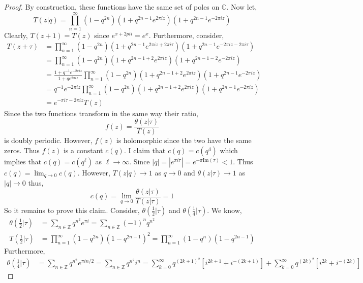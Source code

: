 \documentclass[12pt]{extarticle}
\newcommand{\Z}{\mathbb{Z}}
\newcommand{\C}{\mathbb{C}}
\renewcommand{\Im}[1]{\mathrm{Im}(#1)}
\theoremstyle{definition}
\begin{document}
\begin{proof}
By construction, these functions have the same set of poles on $\C$. Now let,
\[ T(z | q) = \prod_{n = 1}^\infty (1 - q^{2n}) \left(1 + q^{2n - 1} e^{2 \pi i z} \right) \left(1 + q^{2n - 1} e^{-2 \pi i z} \right) \]
Clearly, $T(z + 1) = T(z)$ since $e^{x + 2 pi i} = e^x$. Furthermore, consider,
\begin{align*}
T(z + \tau) & = \prod_{n = 1}^\infty (1 - q^{2n}) \left(1 + q^{2n - 1} e^{2 \pi i z + 2 \pi i \tau} \right) \left(1 + q^{2n - 1} e^{-2 \pi i z - 2 \pi i \tau } \right)
\\
& = \prod_{n = 1}^\infty (1 - q^{2n}) \left(1 + q^{2n - 1 + 2} e^{2 \pi i z } \right) \left(1 + q^{2n - 1 - 2} e^{-2 \pi i z } \right)
\\
& = \frac{1 + q^{-1} e^{-2 \pi i z}}{1 + q e^{2 \pi i z}} \prod_{n = 1}^\infty (1 - q^{2n}) \left(1 + q^{2n - 1 + 2} e^{2 \pi i z } \right) \left(1 + q^{2n - 1} e^{-2 \pi i z } \right)
\\
& = q^{-1} e^{-2 \pi i z} \prod_{n = 1}^\infty (1 - q^{2n}) \left(1 + q^{2n - 1 + 2} e^{2 \pi i z } \right) \left(1 + q^{2n - 1} e^{-2 \pi i z } \right)
\\
& = e^{-\pi i \tau - 2 \pi i z} T(z)
\end{align*}
Since the two functions transform in the same way their ratio,
\[ f(z) = \frac{\theta(z|\tau)}{T(z)} \]
is doubly periodic. However, $f(z)$ is holomorphic since the two have the same zeros. Thus $f(z)$ is a constant $c(q)$. I claim that $c(q) = c(q^4)$ which implies that $c(q) = c(q^\ell)$ as $\ell \to \infty$. Since $|q| = |e^{\pi i \tau}| = e^{- \pi \Im{\tau}} < 1$. Thus $c(q) = \lim_{q \to 0} c(q)$. However, $T(z | q) \to 1$ as $q \to 0$ and $\theta(z | \tau) \to 1$ as $|q| \to 0$ thus,
\[ c(q) = \lim_{q \to 0} \frac{\theta(z | \tau)}{T(z | \tau)} = 1 \]
So it remains to prove this claim. Consider, $\theta(\tfrac{1}{2} | \tau)$ and $\theta(\tfrac{1}{4} | \tau)$. We know,
\begin{align*}
\theta(\tfrac{1}{2} | \tau) & = \sum_{n \in \Z} q^{n^2} e^{\pi i} = \sum_{n \in \Z} (-1)^n q^{n^2} 
\\
T(\tfrac{1}{2} | \tau) & = \prod_{n = 1}^\infty (1 - q^{2n})(1 - q^{2 n - 1})^2 = \prod_{n = 1}^\infty (1 - q^n) (1 - q^{2n - 1})
\end{align*}
Furthermore,
\begin{align*}
\theta(\tfrac{1}{4} | \tau) & = \sum_{n \in \Z} q^{n^2} e^{\pi i n / 2} = \sum_{n \in \Z} q^{n^2} i^n = \sum_{k = 0}^\infty q^{(2 k + 1)^2} \left[ i^{2 k + 1} + i^{-(2k + 1)} \right] + \sum_{k = 0}^\infty q^{(2 k)^2} \left[ i^{2 k} + i^{-(2k)} \right] 

\end{align*}
\end{proof}
\end{document}
